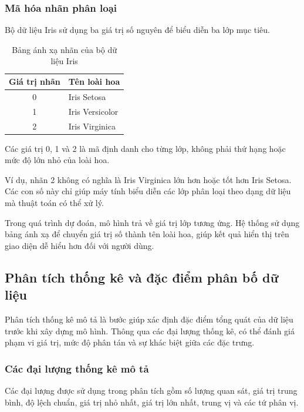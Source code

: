 \documentclass[14pt]{extarticle}
\begin{document}
	\subsubsection{Mã hóa nhãn phân loại}
	
	Bộ dữ liệu Iris sử dụng ba giá trị số nguyên để biểu diễn ba lớp mục tiêu.
	
	\begin{table}[htbp]
		\centering
		\caption{Bảng ánh xạ nhãn của bộ dữ liệu Iris}
		\label{tab:iris-labels}
		\begin{tabular}{|c|l|}
		
			\textbf{Giá trị nhãn} & \textbf{Tên loài hoa} \\
			\hline
			0 & Iris Setosa \\
			\hline
			1 & Iris Versicolor \\
			\hline
			2 & Iris Virginica \\
			\hline
		\end{tabular}
	\end{table}
	
	Các giá trị 0, 1 và 2 là mã định danh cho từng lớp, không phải thứ hạng hoặc mức độ lớn nhỏ của loài hoa.
	
	Ví dụ, nhãn 2 không có nghĩa là Iris Virginica lớn hơn hoặc tốt hơn Iris Setosa. Các con số này chỉ giúp máy tính biểu diễn các lớp phân loại theo dạng dữ liệu mà thuật toán có thể xử lý.
	
	Trong quá trình dự đoán, mô hình trả về giá trị lớp tương ứng. Hệ thống sử dụng bảng ánh xạ để chuyển giá trị số thành tên loài hoa, giúp kết quả hiển thị trên giao diện dễ hiểu hơn đối với người dùng.
	
	\subsection{Phân tích thống kê và đặc điểm phân bố dữ liệu}
	
	Phân tích thống kê mô tả là bước giúp xác định đặc điểm tổng quát của dữ liệu trước khi xây dựng mô hình. Thông qua các đại lượng thống kê, có thể đánh giá phạm vi giá trị, mức độ phân tán và sự khác biệt giữa các đặc trưng.
	
	\subsubsection{Các đại lượng thống kê mô tả}
	
	Các đại lượng được sử dụng trong phân tích gồm số lượng quan sát, giá trị trung bình, độ lệch chuẩn, giá trị nhỏ nhất, giá trị lớn nhất, trung vị và các tứ phân vị.
	
\end{document}
